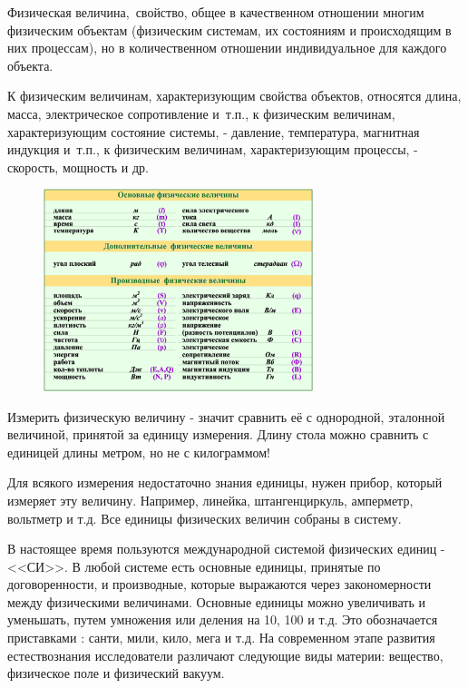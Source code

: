 \documentclass[a6paper, 11pt]{diss_4}
\renewcommand{\'}{\,'}
\begin{document}
Физическая величина, свойство, общее в качественном отношении многим физическим
объектам (физическим системам, их состояниям и происходящим в них
процессам), но в количественном отношении индивидуальное для каждого объекта.

 К физическим величинам, характеризующим свойства объектов, относятся длина,
масса, электрическое сопротивление и т.п., к физическим величинам,
характеризующим состояние системы, - давление, температура, магнитная
индукция и т.п., к физическим величинам, характеризующим процессы, -
скорость, мощность и др.

\begin{figure}[h]
\begin{center}
\includegraphics*[width=0.7\textwidth]{img/img01.png}
\label{fig1}
\end{center}\end{figure}

 Измерить физическую величину - значит сравнить её с однородной, эталонной
величиной, принятой за единицу измерения. Длину стола можно сравнить с
единицей длины метром, но не с килограммом!

 Для всякого измерения недостаточно знания единицы, нужен прибор, который
измеряет эту величину. Например, линейка, штангенциркуль, амперметр,
вольтметр и т.д. Все единицы физических величин собраны в систему.

 В настоящее время пользуются международной системой физических единиц - <<СИ>>.
В любой системе есть основные единицы, принятые по договоренности, и
производные, которые выражаются через закономерности между физическими
величинами. Основные единицы можно увеличивать и уменьшать, путем умножения
или деления на 10, 100 и т.д. Это обозначается приставками : санти, мили,
кило, мега и т.д. На современном этапе развития естествознания исследователи
различают следующие виды материи: вещество, физическое поле и физический
вакуум.
\end{document}
